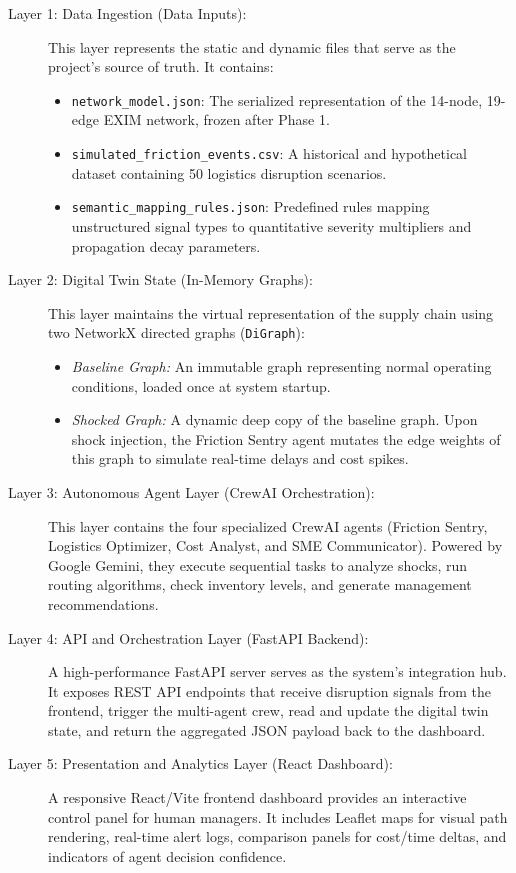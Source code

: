 \begin{description}
    \item[Layer 1: Data Ingestion (Data Inputs):] This layer represents the static and dynamic files that serve as the project's source of truth. It contains:
    \begin{itemize}
        \item \texttt{network\_model.json}: The serialized representation of the 14-node, 19-edge EXIM network, frozen after Phase 1.
        \item \texttt{simulated\_friction\_events.csv}: A historical and hypothetical dataset containing 50 logistics disruption scenarios.
        \item \texttt{semantic\_mapping\_rules.json}: Predefined rules mapping unstructured signal types to quantitative severity multipliers and propagation decay parameters.
    \end{itemize}
    
    \item[Layer 2: Digital Twin State (In-Memory Graphs):] This layer maintains the virtual representation of the supply chain using two NetworkX directed graphs (\texttt{DiGraph}):
    \begin{itemize}
        \item \textit{Baseline Graph:} An immutable graph representing normal operating conditions, loaded once at system startup.
        \item \textit{Shocked Graph:} A dynamic deep copy of the baseline graph. Upon shock injection, the Friction Sentry agent mutates the edge weights of this graph to simulate real-time delays and cost spikes.
    \end{itemize}
    
    \item[Layer 3: Autonomous Agent Layer (CrewAI Orchestration):] This layer contains the four specialized CrewAI agents (Friction Sentry, Logistics Optimizer, Cost Analyst, and SME Communicator). Powered by Google Gemini, they execute sequential tasks to analyze shocks, run routing algorithms, check inventory levels, and generate management recommendations.
    
    \item[Layer 4: API and Orchestration Layer (FastAPI Backend):] A high-performance FastAPI server serves as the system's integration hub. It exposes REST API endpoints that receive disruption signals from the frontend, trigger the multi-agent crew, read and update the digital twin state, and return the aggregated JSON payload back to the dashboard.
    
    \item[Layer 5: Presentation and Analytics Layer (React Dashboard):] A responsive React/Vite frontend dashboard provides an interactive control panel for human managers. It includes Leaflet maps for visual path rendering, real-time alert logs, comparison panels for cost/time deltas, and indicators of agent decision confidence.
\end{description}

